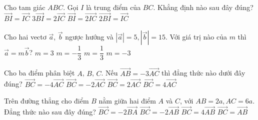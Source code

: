 \begin{ex}%
	Cho tam giác $ABC$. Gọi $I$ là trung điểm của $BC$.  Khẳng định nào sau đây đúng?
	 \choice
		 {\True $\overrightarrow{BI}=\overrightarrow{IC}$}
		{$3\overrightarrow{BI}=2\overrightarrow{IC}$} 
		{$\overrightarrow{BI}=\overrightarrow{2IC}$} 
		{$\overrightarrow{2BI}=\overrightarrow{IC}$} 
\end{ex}

\begin{ex}%
	Cho hai vectơ $\overrightarrow{a}$, $\overrightarrow{b}$ ngược hướng và $\left|\overrightarrow{a}\right|=5,\left|\overrightarrow{b}\right|=15$.  Với giá trị nào của $m$ thì $\overrightarrow{a}=m\overrightarrow{b}$?
	 \choice
		{$m=3$} 
		 {\True $m=-\dfrac{1}{3}$}
		 {$m=\dfrac{1}{3}$}
		{$m=-3$} 
\end{ex}

\begin{ex}%
	Cho ba điểm phân biệt $A$, $B$, $C$. Nếu $\overrightarrow{AB}=-3\overrightarrow{AC}$ thì đẳng thức nào dưới đây  đúng?
	\choice 
		{$\overrightarrow{BC}=-4\overrightarrow{AC}$} 
		 {$\overrightarrow{BC}=-2\overrightarrow{AC}$}
		 {$\overrightarrow{BC}=2\overrightarrow{AC}$}
		 {\True $\overrightarrow{BC}=4\overrightarrow{AC}$}
\end{ex}

\begin{ex}%
	 Trên đường thẳng cho điểm $B$ nằm giữa hai điểm $A$ và $C$, với $AB=2a,AC=6a$. Đẳng thức nào sau đây đúng?
	 \choice
		{\True  $\overrightarrow{BC}=-2\overrightarrow{BA}$}
		 {$\overrightarrow{BC}=-2\overrightarrow{AB}$}
		{$\overrightarrow{BC}=4\overrightarrow{AB}$} 
		 {$\overrightarrow{BC}=\overrightarrow{AB}$}
\end{ex}

